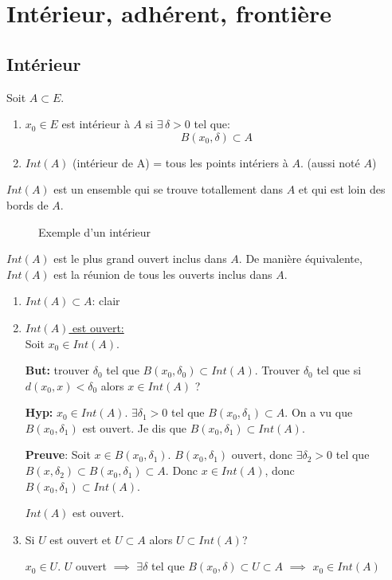 \section{Intérieur, adhérent, frontière}
\subsection{Intérieur}
\begin{definition}
    Soit $A \subset E$.
    \begin{enumerate}
        \item $x_0 \in E$ est intérieur à $A$ si  $\exists \, \delta > 0$ tel que:
            \[
            B(x_0, \delta) \subset A
            \] 
        \item $Int(A)$ (intérieur de A) = tous les points intériers à  $A$. (aussi noté $A$)
    \end{enumerate}
\end{definition}
\begin{intuition}
   $Int(A)$ est un ensemble qui se trouve totallement dans $A$ et qui est loin des bords de  $A$.
\end{intuition}
\begin{figure}[ht]
    \centering
    \caption{Exemple d'un intérieur}
    \label{fig:interieur-exemple}
\end{figure}
\begin{prop}
   $Int(A)$ est le plus grand ouvert inclus dans  $A$. De manière équivalente, $Int(A)$ est la réunion de tous les ouverts inclus dans  $A$.
\end{prop}
\begin{preuve}
   \begin{enumerate}
       \item $Int(A) \subset A$: clair
       \item \underline{$Int(A)$ est ouvert:} \\
           Soit $x_0 \in Int(A)$. 
           \par
           \textbf{But:} trouver $\delta_0$ tel que  $B(x_0, \delta_0) \subset Int(A)$. Trouver $\delta_0$ tel que si $d(x_0, x) < \delta_0$ alors $x \in Int(A)$ ?
           \par
           \textbf{Hyp:}  $x_0 \in Int(A)$. $\exists \delta_1 > 0$ tel que $B(x_0, \delta_1) \subset A$. On a vu que $B(x_0, \delta_1)$ est ouvert.
           Je dis que $B(x_0, \delta_1) \subset Int(A)$.
           \par
           \textbf{Preuve}: Soit $x \in B(x_0, \delta_1)$. $B(x_0, \delta_1)$ ouvert, donc $\exists \delta_2 > 0$ tel que $B(x, \delta_2) \subset B(x_0, \delta_1) \subset A$. Donc $x \in Int(A)$, donc  $B(x_0, \delta_1) \subset Int(A)$.\par
           $Int(A)$ est ouvert.
       \item Si $U$ est ouvert et  $U \subset A$ alors $U \subset Int(A)$?
           \par
           $x_0 \in U$. $U$ ouvert  $\implies$ $\exists \delta$ tel que $B(x_0, \delta) \subset U \subset A$ $\implies$ $x_0 \in Int(A)$
   \end{enumerate} 
\end{preuve}

